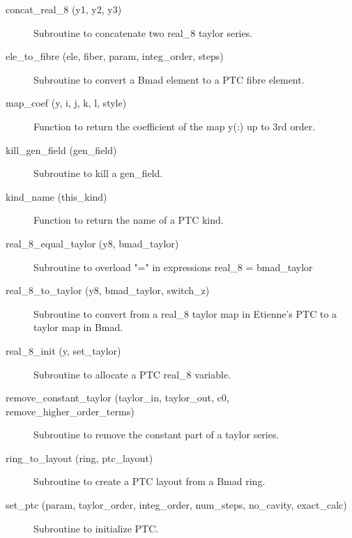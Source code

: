 \begin{description}

\item[concat\_real\_8 (y1, y2, y3)] \Newline
Subroutine to concatenate two real\_8 taylor series. 

\item[ele\_to\_fibre (ele, fiber, param, integ\_order, steps)] \Newline
Subroutine to convert a Bmad element to a PTC fibre element. 

\item[map\_coef (y, i, j, k, l, style)] \Newline
Function to return the coefficient of the map y(:) up to 3rd order. 

\item[kill\_gen\_field (gen\_field)] \Newline
Subroutine to kill a gen\_field. 

\item[kind\_name (this\_kind)] \Newline
Function to return the name of a PTC kind. 

\item[real\_8\_equal\_taylor (y8, bmad\_taylor)] \Newline
Subroutine to overload "=" in expressions real\_8 = bmad\_taylor 

\item[real\_8\_to\_taylor (y8, bmad\_taylor, switch\_z)] \Newline
Subroutine to convert from a real\_8 taylor map in Etienne's PTC to a taylor map in Bmad. 

\item[real\_8\_init (y, set\_taylor)] \Newline
Subroutine to allocate a PTC real\_8 variable. 

\item[remove\_constant\_taylor (taylor\_in, taylor\_out, c0, remove\_higher\_order\_terms)] \Newline
Subroutine to remove the constant part of a taylor series. 

\item[ring\_to\_layout (ring, ptc\_layout)] \Newline
Subroutine to create a PTC layout from a Bmad ring. 

\item[set\_ptc (param, taylor\_order, integ\_order, num\_steps, no\_cavity, exact\_calc)] \Newline
Subroutine to initialize PTC. 


\end{description}
